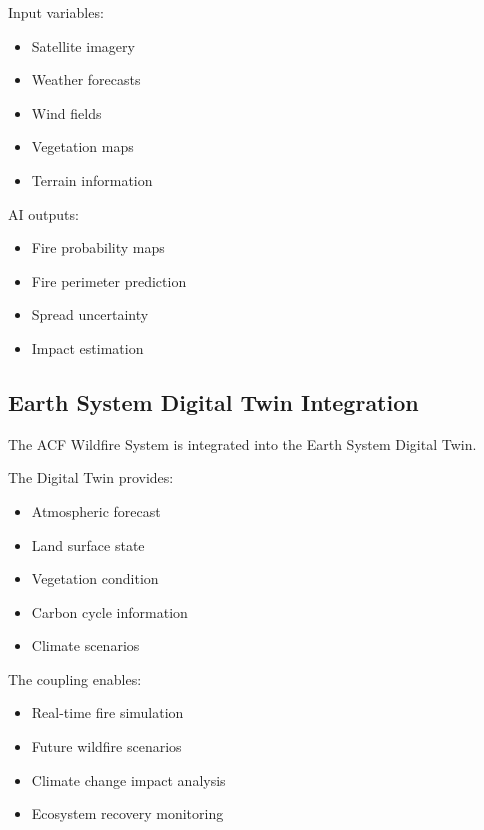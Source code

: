 Input variables:

\begin{itemize}

\item Satellite imagery

\item Weather forecasts

\item Wind fields

\item Vegetation maps

\item Terrain information

\end{itemize}


AI outputs:

\begin{itemize}

\item Fire probability maps

\item Fire perimeter prediction

\item Spread uncertainty

\item Impact estimation

\end{itemize}



\subsection{Earth System Digital Twin Integration}

The ACF Wildfire System is integrated into the Earth System Digital Twin.

The Digital Twin provides:

\begin{itemize}

\item Atmospheric forecast

\item Land surface state

\item Vegetation condition

\item Carbon cycle information

\item Climate scenarios

\end{itemize}


The coupling enables:

\begin{itemize}

\item Real-time fire simulation

\item Future wildfire scenarios

\item Climate change impact analysis

\item Ecosystem recovery monitoring

\end{itemize}



